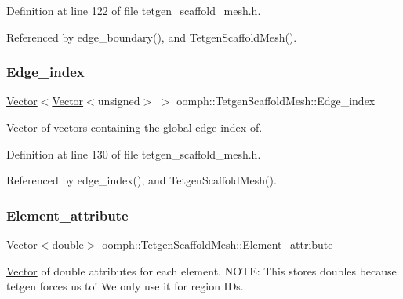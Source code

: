 Definition at line 122 of file tetgen\+\_\+scaffold\+\_\+mesh.\+h.



Referenced by edge\+\_\+boundary(), and Tetgen\+Scaffold\+Mesh().

\mbox{\label{classoomph_1_1TetgenScaffoldMesh_abfe6528465bcfd20119a23a397f846b0}} 
\subsubsection{\texorpdfstring{Edge\+\_\+index}{Edge\_index}}
{\footnotesize\ttfamily \hyperlink{classoomph_1_1Vector}{Vector}$<$\hyperlink{classoomph_1_1Vector}{Vector}$<$unsigned$>$ $>$ oomph\+::\+Tetgen\+Scaffold\+Mesh\+::\+Edge\+\_\+index\hspace{0.3cm}{\ttfamily [protected]}}



\hyperlink{classoomph_1_1Vector}{Vector} of vectors containing the global edge index of. 



Definition at line 130 of file tetgen\+\_\+scaffold\+\_\+mesh.\+h.



Referenced by edge\+\_\+index(), and Tetgen\+Scaffold\+Mesh().

\mbox{\label{classoomph_1_1TetgenScaffoldMesh_a47b01372fe4cf5c305169fdb57fc5e5a}} 
\subsubsection{\texorpdfstring{Element\+\_\+attribute}{Element\_attribute}}
{\footnotesize\ttfamily \hyperlink{classoomph_1_1Vector}{Vector}$<$double$>$ oomph\+::\+Tetgen\+Scaffold\+Mesh\+::\+Element\+\_\+attribute\hspace{0.3cm}{\ttfamily [protected]}}



\hyperlink{classoomph_1_1Vector}{Vector} of double attributes for each element. N\+O\+TE\+: This stores doubles because tetgen forces us to! We only use it for region I\+Ds. 



